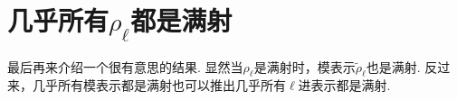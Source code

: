 \section{几乎所有\texorpdfstring{$\rho_{\ell}$}{rho ell}都是满射}

最后再来介绍一个很有意思的结果.
显然当$\rho_{\ell}$是满射时，模表示$\tilde{\rho}_{\ell}$也是满射.
反过来，几乎所有模表示都是满射也可以推出几乎所有$\ell$进表示都是满射.







